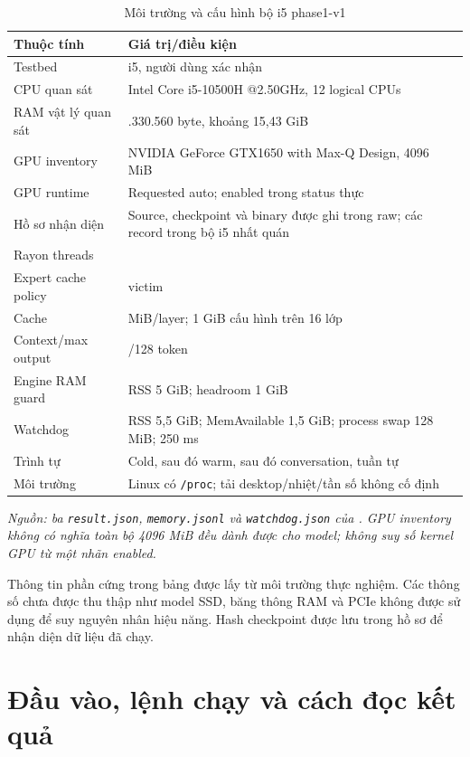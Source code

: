 \begin{table}[htbp]
\centering
\caption{Môi trường và cấu hình bộ i5 phase1-v1}
\small
\setlength{\tabcolsep}{3pt}
\begin{tabularx}{\textwidth}{>{\RaggedRight\arraybackslash}p{4.5cm} >{\RaggedRight\arraybackslash}X}
\toprule
\textbf{Thuộc tính} & \textbf{Giá trị/điều kiện} \\
\midrule
Testbed & i5, người dùng xác nhận \\
CPU quan sát & Intel Core i5-10500H @2.50GHz, 12 logical CPUs \\
RAM vật lý quan sát & 16.571.330.560 byte, khoảng 15,43 GiB \\
GPU inventory & NVIDIA GeForce GTX1650 with Max-Q Design, 4096 MiB \\
GPU runtime & Requested auto; enabled trong status thực \\
Hồ sơ nhận diện & Source, checkpoint và binary được ghi trong raw; các record trong bộ i5 nhất quán \\
Rayon threads & 8 \\
Expert cache policy & victim \\
Cache & 64 MiB/layer; 1 GiB cấu hình trên 16 lớp \\
Context/max output & 512/128 token \\
Engine RAM guard & RSS 5 GiB; headroom 1 GiB \\
Watchdog & RSS 5,5 GiB; MemAvailable 1,5 GiB; process swap 128 MiB; 250 ms \\
Trình tự & Cold, sau đó warm, sau đó conversation, tuần tự \\
Môi trường & Linux có \nolinkurl{/proc}; tải desktop/nhiệt/tần số không cố định \\
\bottomrule
\end{tabularx}

\textit{Nguồn: ba \texttt{result.json}, \texttt{memory.jsonl} và \texttt{watchdog.json} của \cite{exp_phase1_i5}. GPU inventory không có nghĩa toàn bộ 4096 MiB đều dành được cho model; không suy số kernel GPU từ một nhãn enabled.}
\end{table}



Thông tin phần cứng trong bảng được lấy từ môi trường thực nghiệm. Các thông số chưa được thu thập như model SSD, băng thông RAM và PCIe không được sử dụng để suy nguyên nhân hiệu năng. Hash checkpoint được lưu trong hồ sơ để nhận diện dữ liệu đã chạy.

\section{Đầu vào, lệnh chạy và cách đọc kết quả}

